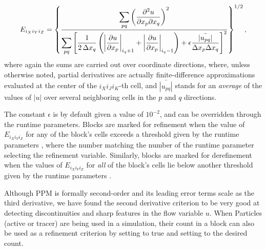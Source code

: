 \begin{equation}
E_{i_Xi_Yi_Z} = \left\{
            {\displaystyle
            \sum_{pq}\left({\partial^2 u\over\partial x_p\partial x_q}
                                               \right)^2
            }
            \over
            {\displaystyle
            \sum_{pq}\left[ \frac{1}{2\,\Delta x_q}\left(
                         \left|{\partial u\over\partial x_p}\right|_{i_q+1}
                         + \left|{\partial u\over\partial x_p}\right|_{i_q-1}
                           \right)
                           + \epsilon{\bar{\left|u_{pq}\right|}\over
                           \Delta x_p\Delta x_q}
                     \right]^2
            }
          \right\}^{1/2},
\end{equation}
where again the sums are carried out over coordinate directions, where,
unless otherwise noted, partial
derivatives are actually finite-difference approximations
evaluated at the center of the $i_Xi_Ji_K$-th cell,
and $\bar{\left|u_{pq}\right|}$ stands for an \emph{average} of the values of $\left|u\right|$ over several
neighboring cells in the $p$ and $q$ directions.


The constant
$\epsilon$ is by default given a value of $10^{-2}$, and can be overridden
through the  runtime parameters.
Blocks are marked for refinement when the value of $E_{i_Xi_Yi_Z}$ for any of the
block's cells exceeds a threshold given by the runtime parameters
, where the number \code{\#}
matching the number of the  runtime parameter
selecting the refinement variable.
Similarly, blocks are marked for derefinement when the values of $E_{i_Xi_Yi_Z}$ for \emph{all}
of the
block's cells lie below another threshold given by the runtime parameters
.


Although PPM
is formally second-order and its leading error terms scale as the
third derivative, we have found the second derivative criterion to
be very good at detecting discontinuities and sharp features in the
flow variable $u$. When \unit{Particles} (active or tracer) are being
used in a simulation, their count in a block can also be used as a
refinement criterion by setting  to true
and setting  to the desired count.





